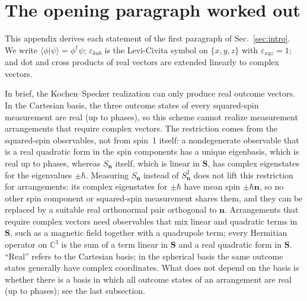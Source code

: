 \documentclass[twocolumn,aps,pra,floatfix,amsmath,amssymb,longbibliography]{revtex4-2}
\newcommand{\C}{\mathbb{C}}
\begin{document}
\appendix

\section{The opening paragraph worked out}
\label{app:spin1}

This appendix derives each statement of the first paragraph of Sec.~\ref{sec:intro}.  We write $\langle\phi|\psi\rangle=\phi^\dagger\psi$; $\varepsilon_{kab}$ is the Levi-Civita symbol on $\{x,y,z\}$ with $\varepsilon_{xyz}=1$; and dot and cross products of real vectors are extended linearly to complex vectors.

In brief, the Kochen--Specker realization can only produce real outcome vectors.  In the Cartesian basis, the three outcome states of every squared-spin measurement are real (up to phases), so this scheme cannot realize measurement arrangements that require complex vectors.  The restriction comes from the squared-spin observables, not from spin~1 itself: a nondegenerate observable that is a real quadratic form in the spin components has a unique eigenbasis, which is real up to phases, whereas $S_{\mathbf n}$ itself, which is linear in $\mathbf S$, has complex eigenstates for the eigenvalues $\pm\hbar$.  Measuring $S_{\mathbf n}$ instead of $S_{\mathbf n}^2$ does not lift this restriction for arrangements: its complex eigenstates for $\pm\hbar$ have mean spin $\pm\hbar\mathbf n$, so no other spin component or squared-spin measurement shares them, and they can be replaced by a suitable real orthonormal pair orthogonal to $\mathbf n$.  Arrangements that require complex vectors need observables that mix linear and quadratic terms in $\mathbf S$, such as a magnetic field together with a quadrupole term; every Hermitian operator on $\C^3$ is the sum of a term linear in $\mathbf S$ and a real quadratic form in $\mathbf S$.  ``Real'' refers to the Cartesian basis; in the spherical basis the same outcome states generally have complex coordinates.  What does not depend on the basis is whether there is a basis in which all outcome states of an arrangement are real (up to phases); see the last subsection.
\end{document}
